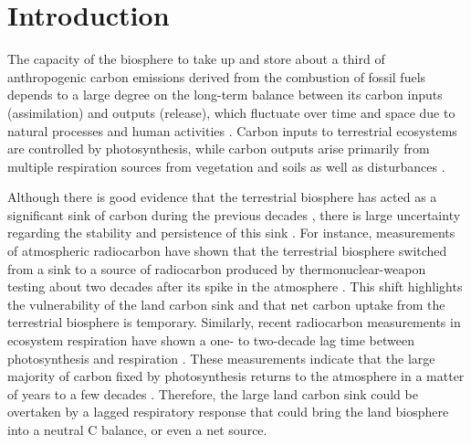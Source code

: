 \documentclass[ProofPDF]{./Styles/Jnls-Template-V3}
\begin{document}
\maketitle
\linenumbers

\section{Introduction}
The capacity of the biosphere to take up and store about a third of anthropogenic carbon emissions derived from the combustion of fossil fuels \citep{Ruehr2023,Friedlingstein2025} depends to a large degree on the long-term balance between its carbon inputs (assimilation) and outputs (release), which fluctuate over time and space due to natural processes and human activities \citep{Malhi1999}. Carbon inputs to terrestrial ecosystems are controlled by photosynthesis, while carbon outputs arise primarily from multiple respiration sources from vegetation and soils as well as disturbances \citep{Wisniewski1993}. 

Although there is good evidence that the terrestrial biosphere has acted as a significant sink of carbon during the previous decades \citep{Walker2021,Ruehr2023,Sitch2024}, there is large uncertainty regarding the stability and persistence of this sink \citep{Canadell2007,Fernandez-Martinez2023}. For instance, measurements of atmospheric radiocarbon have shown that the terrestrial biosphere switched from a sink to a source of radiocarbon produced by thermonuclear-weapon testing about two decades after its spike in the atmosphere \citep{Naegler2009,Levin2022}. This shift highlights the vulnerability of the land carbon sink and that net carbon uptake from the terrestrial biosphere is temporary. Similarly, recent radiocarbon measurements in ecosystem respiration have shown a one- to two-decade lag time between photosynthesis and respiration \citep{Tangarife2024JGR,Chanca2025,Sierra2026CCCR}. These measurements indicate that the large majority of carbon fixed by photosynthesis returns to the atmosphere in a matter of years to a few decades \citep{Sierra2023PTRS}. Therefore, the large land carbon sink could be overtaken by a lagged respiratory response that could bring the land biosphere into a neutral C balance, or even a net source. 
\end{document}
